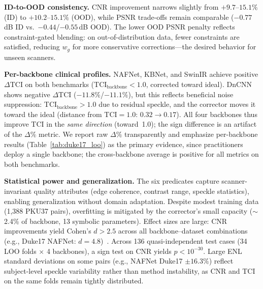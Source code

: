 \documentclass[journal,twoside,web]{ieeecolor}
\begin{document}
\textbf{ID-to-OOD consistency.} CNR improvement narrows slightly from $+9.7$--$15.1\%$ (ID) to $+10.2$--$15.1\%$ (OOD), while PSNR trade-offs remain comparable ($-0.77$\,dB ID vs.\ $-0.44$/$-0.55$\,dB OOD). The lower OOD PSNR penalty reflects constraint-gated blending: on out-of-distribution data, fewer constraints are satisfied, reducing $w_g$ for more conservative corrections---the desired behavior for unseen scanners.

\textbf{Per-backbone clinical profiles.} NAFNet, KBNet, and SwinIR achieve positive $\Delta$TCI on both benchmarks (TCI$_\text{backbone} < 1.0$, corrected toward ideal). DnCNN shows negative $\Delta$TCI ($-11.8\%$/$-11.1\%$), but this reflects beneficial noise suppression: TCI$_\text{backbone} > 1.0$ due to residual speckle, and the corrector moves it toward the ideal (distance from TCI${}=1.0$: $0.32 \to 0.17$). All four backbones thus improve TCI in the \emph{same direction} (toward~1.0); the sign difference is an artifact of the $\Delta\%$ metric. We report raw $\Delta\%$ transparently and emphasize per-backbone results (Table~\ref{tab:duke17_loo}) as the primary evidence, since practitioners deploy a single backbone; the cross-backbone average is positive for all metrics on both benchmarks.

\textbf{Statistical power and generalization.} The six predicates capture scanner-invariant quality attributes (edge coherence, contrast range, speckle statistics), enabling generalization without domain adaptation. Despite modest training data (1,388 PKU37 pairs), overfitting is mitigated by the corrector's small capacity (${\sim}$2.4\% of backbone, 13 symbolic parameters). Effect sizes are large: CNR improvements yield Cohen's $d > 2.5$ across all backbone--dataset combinations (e.g., Duke17 NAFNet: $d = 4.8$)~\cite{cohen1988statistical}. Across 136 quasi-independent test cases (34 LOO folds $\times$ 4 backbones), a sign test on CNR yields $p < 10^{-30}$. Large ENL standard deviations on some pairs (e.g., NAFNet Duke17 $\pm 16.3\%$) reflect subject-level speckle variability rather than method instability, as CNR and TCI on the same folds remain tightly distributed.
\end{document}
